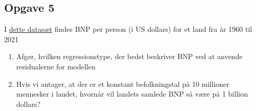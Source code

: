 \documentclass[12pt]{article}
\begin{document}
\subsection*{Opgave 5}

I \href{https://github.com/ChristianJLex/TeachingNotes/raw/master/2023-2024/Data%20og%20lign/BNPResidual.xlsx}{\color{blue!60} dette datasæt} findes BNP per person (i US dollars) for et land fra år 1960 til 2021
\begin{enumerate}[label=\roman*)]
	\item Afgør, hvilken regressionstype, der bedst beskriver BNP ved at anvende residualerne for modellen
	\item Hvis vi antager, at der er et konstant befolkningstal på 10 millioner mennesker i landet, hvornår vil landets samlede BNP så være på 1 billion dollars?
	
\end{enumerate}
\end{document}
